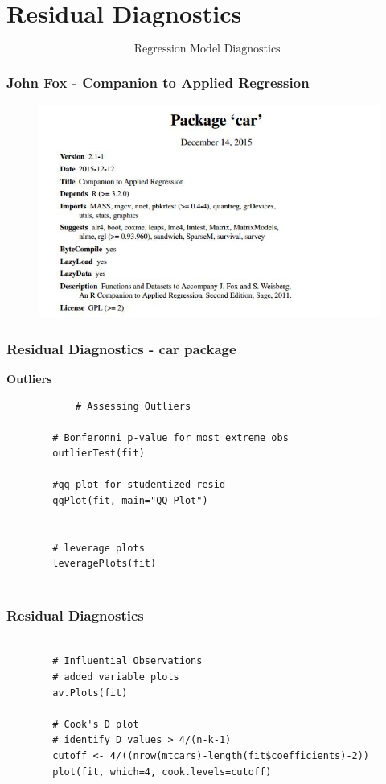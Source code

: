 \documentclass{beamer}
\begin{document}
\section{Residual Diagnostics}
\begin{frame}
	\LARGE
	\[\mbox{Regression Model Diagnostics }\]
\end{frame}
\begin{frame}
	\frametitle{John Fox - Companion to Applied Regression}
	\begin{figure}
\centering
\includegraphics[width=1.1\linewidth]{images/CRAN-car}

\end{figure}

\end{frame}
\begin{frame}[fragile]
	\frametitle{Residual Diagnostics - car package}
\large
\textbf{Outliers}
	\begin{framed}
		\begin{verbatim}
			# Assessing Outliers
		
		# Bonferonni p-value for most extreme obs
		outlierTest(fit) 
		
		#qq plot for studentized resid 
		qqPlot(fit, main="QQ Plot") 
		
		
		# leverage plots
		leveragePlots(fit) 
		
		\end{verbatim}
	\end{framed}
\end{frame}
\begin{frame}[fragile]
	\frametitle{Residual Diagnostics}
	\large
	\begin{framed}
		\begin{verbatim}
		
		# Influential Observations
		# added variable plots 
		av.Plots(fit)
		
		# Cook's D plot
		# identify D values > 4/(n-k-1) 
		cutoff <- 4/((nrow(mtcars)-length(fit$coefficients)-2)) 
		plot(fit, which=4, cook.levels=cutoff)
		\end{verbatim}
	\end{framed}
\end{frame}
\end{document}
